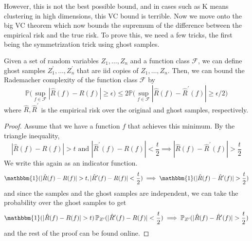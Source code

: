 \documentclass{article}
\begin{document}
    However, this is not the best possible bound, and in cases such as K means clustering in high dimensions, this VC bound is terrible. Now we move onto the big VC theorem which now bounds the supremum of the difference between the empirical risk and the true risk. To prove this, we need a few tricks, the first being the symmetrization trick using ghost samples. 

    \begin{lemma}
      Given a set of random variables $Z_1, \ldots, Z_n$ and a function class $\mathcal{F}$, we can define ghost samples $Z_1^\prime, \ldots, Z_n^\prime$ that are iid copies of $Z_1, \ldots, Z_n$. Then, we can bound the Rademacher complexity of the function class $\mathcal{F}$ by 
      \begin{equation}
        \mathbb{P} \bigg( \sup_{f \in \mathcal{F}} | \hat{R} (f) - R(f) | \geq \epsilon \bigg) \leq 2 \mathbb{P} \bigg( \sup_{f \in \mathcal{F}} | \hat{R} (f) - \hat{R}^\prime (f) | \geq \epsilon / 2 \bigg)
      \end{equation}
      where $\hat{R}, \hat{R}^\prime$ is the empirical risk over the original and ghost samples, respectively. 
    \end{lemma}
    \begin{proof}
      Assume that we have a function $f$ that achieves this minimum. By the triangle inequality, 
      \begin{equation}
        | \hat{R} (f) - R(f)| > t \text{ and } | \hat{R}^\prime (f) - R(f)| < \frac{t}{2} \implies | \hat{R} (f) - \hat{R}^\prime (f) | > \frac{t}{2}
      \end{equation}
      We write this again as an indicator function. 
      \begin{equation}
        \mathbbm{1} (| \hat{R} (f) - R(f)| > t, | \hat{R}^\prime (f) - R(f)| < \frac{t}{2}) \implies \mathbbm{1} (| \hat{R} (f) - \hat{R}^\prime (f) | > \frac{t}{2})
      \end{equation}
      and since the samples and the ghost samples are independent, we can take the probability over the ghost samples to get 
      \begin{equation}
        \mathbbm{1} (| \hat{R} (f) - R(f)| > t) \, \mathbb{P}_{Z^\prime} (| \hat{R}^\prime (f) - R(f)| < \frac{t}{2}) \implies \mathbb{P}_{Z^\prime} (| \hat{R} (f) - \hat{R}^\prime (f) | > \frac{t}{2})
      \end{equation}
      and the rest of the proof can be found online. 
    \end{proof}
\end{document}
